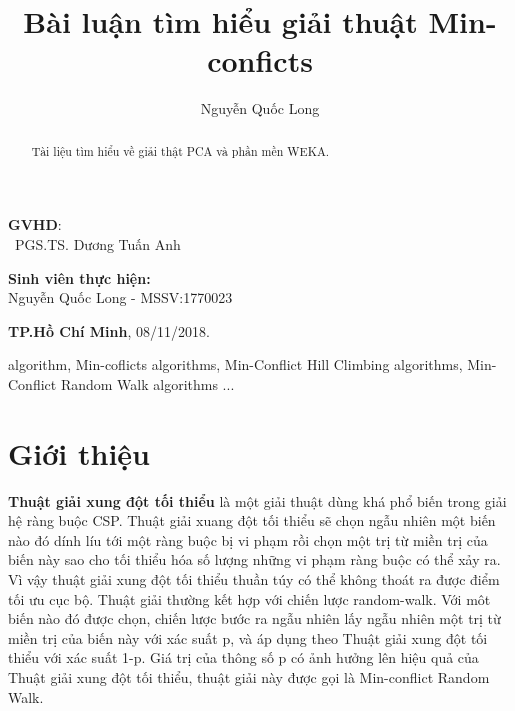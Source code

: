 \documentclass{hcmutarticle}
\begin{document}
\vspace{2cm}

\begin{minipage}[t]{0.60\linewidth}
\textbf{GVHD}: \\
\ PGS.TS. Dương Tuấn Anh
\end{minipage}
\begin{minipage}[t]{0.40\linewidth}
\textbf{Sinh viên thực hiện:}\\
Nguyễn Quốc Long - MSSV:1770023
\end{minipage}

\vspace{4cm}

\begin{center}

\textbf{TP.Hồ Chí Minh},
08/11/2018.

\end{center}



\newpage

\tableofcontents 

\newpage

\title{Bài luận tìm hiểu giải thuật Min-conficts}

\author{  Nguyễn Quốc Long} 





\maketitle



\begin{abstract}
Tài liệu tìm hiểu về giải thật PCA và phần mền WEKA.


\end{abstract}

\begin{keywords}
algorithm, Min-coflicts algorithms, Min-Conflict Hill Climbing algorithms, Min-Conflict Random Walk algorithms ...
\end{keywords} 


\section{Giới thiệu}

\textbf{Thuật giải xung đột tối thiểu} 
 là một giải thuật dùng khá phổ biến trong giải hệ ràng buộc CSP. Thuật giải xuang đột tối thiểu sẽ chọn ngẫu nhiên một biến nào đó dính líu tới một ràng buộc bị vi phạm rồi chọn một trị từ miền trị của biến này sao cho tối thiểu hóa số lượng những vi phạm ràng buộc có thể xảy ra. Vì vậy thuật giải xung đột tối thiểu thuần túy có thể không thoát ra được điểm tối ưu cục bộ. Thuật giải thường kết hợp với chiến lược random-walk. Với môt biến nào đó được chọn, chiến lược bước ra ngẫu nhiên lấy ngẫu nhiên một trị từ miền trị của biến này với xác suất p, và áp dụng theo Thuật giải xung đột tối thiểu với xác suất 1-p. Giá trị của thông số p có ảnh hưởng lên hiệu quả của Thuật giải xung đột tối thiểu, thuật giải này được gọi là Min-conflict Random Walk.
\end{document}
